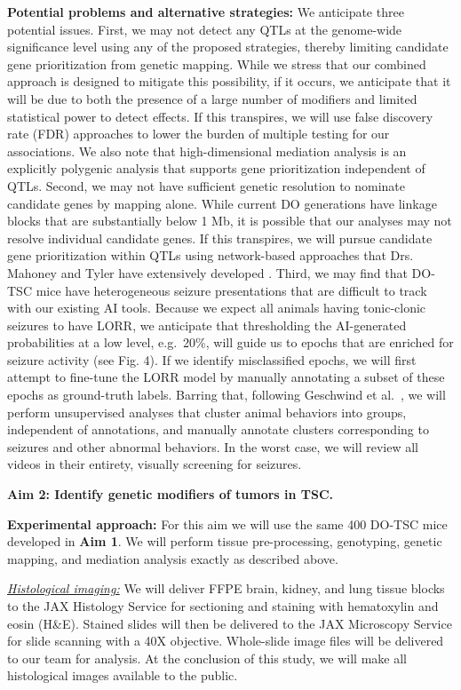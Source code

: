 \documentclass[
  12pt,
]{article}
\begin{document}
\textbf{Potential problems and alternative strategies:} We anticipate
three potential issues. First, we may not detect any QTLs at the
genome-wide significance level using any of the proposed strategies,
thereby limiting candidate gene prioritization from genetic mapping.
While we stress that our combined approach is designed to mitigate this
possibility, if it occurs, we anticipate that it will be due to both the
presence of a large number of modifiers and limited statistical power to
detect effects. If this transpires, we will use false discovery rate
(FDR) approaches \cite{24062767} to lower the burden of multiple testing
for our associations. We also note that high-dimensional mediation
analysis is an explicitly polygenic analysis that supports gene
prioritization independent of QTLs. Second, we may not have sufficient
genetic resolution to nominate candidate genes by mapping alone. While
current DO generations have linkage blocks that are substantially below
1 Mb, it is possible that our analyses may not resolve individual
candidate genes. If this transpires, we will pursue candidate gene
prioritization within QTLs using network-based approaches that Drs.
Mahoney and Tyler have extensively developed \cite{33889174, 31645420}.
Third, we may find that DO-TSC mice have heterogeneous seizure
presentations that are difficult to track with our existing AI tools.
Because we expect all animals having tonic-clonic seizures to have LORR,
we anticipate that thresholding the AI-generated probabilities at a low
level, e.g.~20\%, will guide us to epochs that are enriched for seizure
activity (see Fig. 4). If we identify misclassified epochs, we will
first attempt to fine-tune the LORR model by manually annotating a
subset of these epochs as ground-truth labels. Barring that, following
Geschwind et al.~\cite{36841241}, we will perform unsupervised analyses
that cluster animal behaviors into groups, independent of annotations,
and manually annotate clusters corresponding to seizures and other
abnormal behaviors. In the worst case, we will review all videos in
their entirety, visually screening for seizures.

\textbf{Aim 2: Identify genetic modifiers of tumors in TSC.}

\textbf{Experimental approach:} For this aim we will use the same 400
DO-TSC mice developed in \textbf{Aim 1}. We will perform tissue
pre-processing, genotyping, genetic mapping, and mediation analysis
exactly as described above.

\textit{\underline{Histological imaging:}} We will deliver FFPE brain,
kidney, and lung tissue blocks to the JAX Histology Service for
sectioning and staining with hematoxylin and eosin (H\&E). Stained
slides will then be delivered to the JAX Microscopy Service for slide
scanning with a 40X objective. Whole-slide image files will be delivered
to our team for analysis. At the conclusion of this study, we will make
all histological images available to the public.
\end{document}
